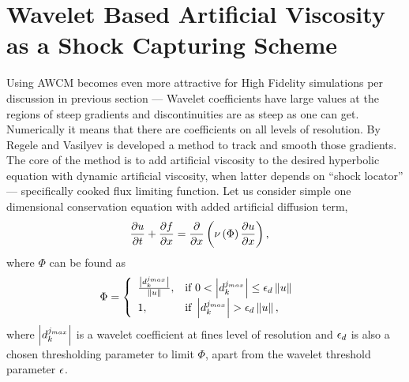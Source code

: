 \section{Wavelet Based Artificial Viscosity as a Shock Capturing Scheme}
Using AWCM becomes even more attractive for High Fidelity simulations per discussion in previous section --- Wavelet coefficients have large values at the regions of steep gradients and discontinuities are as steep as one can get. Numerically it means that there are coefficients on all levels of resolution. By Regele and Vasilyev \cite{lib:RegVas} is developed a method to track and smooth those gradients. The core of the method is to add artificial viscosity to the desired hyperbolic equation with dynamic artificial viscosity, when latter depends on ``shock locator'' --- specifically cooked flux limiting function. Let us consider simple one dimensional conservation equation with added artificial diffusion term,
\begin{align}
\frac {\partial u}{\partial t} + \frac {\partial f}{\partial x} &= \frac {\partial} {\partial x} \left(\nu \left(\Phi\right) \frac {\partial u}{\partial x}\right),
\end{align}
where $\Phi$ can be found as
\begin{align}
\Phi &= \left\{\begin{array}{ll}
\frac {\left|d_k^{j_{max}}\right|}{\left\|u\right\|}, & \textmd{if } 0 < \left|d_k^{j_{max}}\right| \le \epsilon_d \left\|u\right\| \\
1, & \textmd{if } \left|d_k^{j_{max}}\right| > \epsilon_d \left\|u\right\|,
\end{array}\right.
\end{align}
where $\left|d_k^{j_{max}}\right|$ is a wavelet coefficient at fines level of resolution and $\epsilon_d$ is also a chosen thresholding parameter to limit $\Phi$, apart from the wavelet threshold parameter $\epsilon$.

